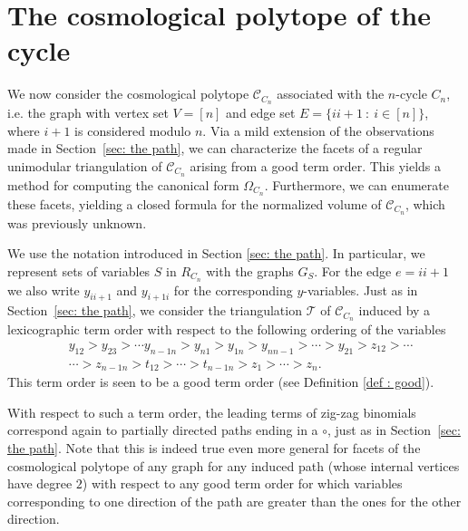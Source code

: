 \documentclass[11pt]{article}
\theoremstyle{definition}
\numberwithin{equation}{section}
\begin{document}
\section{The cosmological polytope of the cycle}
\label{sec: the cycle}
We now consider the cosmological polytope $\mathcal{C}_{C_n}$ associated with the $n$-cycle $C_n$, i.e. the graph with vertex set $V = [n]$ and edge set $E=\{ii+1 ~:~ i\in [n]\}$, where $i+1$ is considered modulo $n$.
Via a mild extension of the observations made in Section~\ref{sec: the path}, we can characterize the facets of a regular unimodular triangulation of $\mathcal{C}_{C_n}$ arising from a good term order. 
This yields a method for computing the canonical form $\Omega_{C_n}$. 
Furthermore, we can enumerate these facets, yielding a closed formula for the normalized volume of $\mathcal{C}_{C_n}$, which was previously unknown. 

We use the notation introduced in Section \ref{sec: the path}. 
In particular, we represent sets of variables $S$ in $R_{C_n}$ with the graphs $G_S$.  
For the edge $e=ii+1$ we  also write $y_{ii+1}$ and $y_{i+1i}$ for the corresponding $y$-variables. 
Just as in Section~\ref{sec: the path}, we consider the triangulation $\mathcal{T}$ of $\mathcal{C}_{C_n}$ induced by a lexicographic term order with respect to the following ordering of the variables 
\begin{align}
    \label{eq: order cycle}
    &y_{12}>y_{23}>\cdots y_{n-1n}>y_{n1}>y_{1n}>y_{nn-1}>\cdots>y_{21} > z_{12} > \cdots \\
    &\cdots> z_{n-1n} > t_{12} > \cdots > t_{n-1n} > z_1 > \cdots > z_n \nonumber.
\end{align}
This term order is seen to be a good term order (see Definition \ref{def : good}).

With respect to such a term order, the leading terms of zig-zag binomials correspond again to partially directed paths ending in a $\circ$, just as in Section~\ref{sec: the path}.  
Note that this is indeed true even more general for facets of the cosmological polytope of any graph for any induced path (whose internal vertices have degree $2$) with respect to any good term order for which variables corresponding to one direction of the path are greater than the ones for the other direction. 
\end{document}
